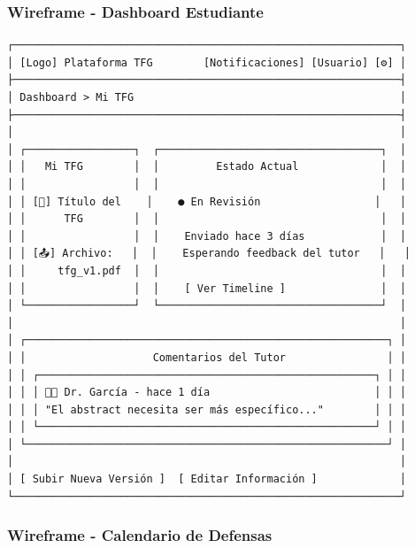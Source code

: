 \documentclass[12pt,a4paper,oneside]{report}
\begin{document}
\subsubsection{Wireframe - Dashboard
Estudiante}\label{wireframe---dashboard-estudiante}

\begin{lstlisting}
┌─────────────────────────────────────────────────────────────┐
│ [Logo] Plataforma TFG        [Notificaciones] [Usuario] [⚙] │
├─────────────────────────────────────────────────────────────┤
│ Dashboard > Mi TFG                                          │
├─────────────────────────────────────────────────────────────┤
│                                                             │
│ ┌─────────────────┐  ┌───────────────────────────────────┐  │
│ │   Mi TFG        │  │         Estado Actual             │  │
│ │                 │  │                                   │  │
│ │ [📄] Título del    │    ● En Revisión                  │   │
│ │      TFG        │  │                                   │  │
│ │                 │  │    Enviado hace 3 días            │  │
│ │ [📤] Archivo:   │  │    Esperando feedback del tutor   │   │
│ │     tfg_v1.pdf  │  │                                   │  │
│ │                 │  │    [ Ver Timeline ]               │  │
│ └─────────────────┘  └───────────────────────────────────┘  │
│                                                             │
│ ┌─────────────────────────────────────────────────────────┐ │
│ │                    Comentarios del Tutor                │ │
│ │ ┌─────────────────────────────────────────────────────┐ │ │
│ │ │ 👨‍🏫 Dr. García - hace 1 día                          │ │ │
│ │ │ "El abstract necesita ser más específico..."        │ │ │
│ │ └─────────────────────────────────────────────────────┘ │ │
│ └─────────────────────────────────────────────────────────┘ │
│                                                             │
│ [ Subir Nueva Versión ]  [ Editar Información ]             │
└─────────────────────────────────────────────────────────────┘
\end{lstlisting}

\subsubsection{Wireframe - Calendario de
Defensas}\label{wireframe---calendario-de-defensas}
\end{document}
